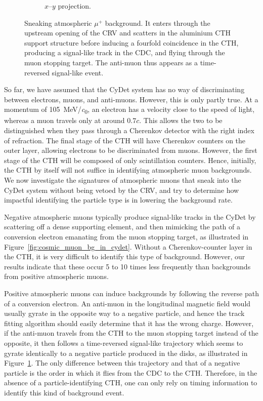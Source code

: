 \begin{figure}
\begin{subfigure}{0.43\textwidth}
        \caption{$x$--$y$ projection.}
    \end{subfigure}
    \caption{ Sneaking atmospheric $\mu^+$ background. It enters through the
        upstream opening of the CRV and scatters in the aluminium CTH support
        structure before inducing a fourfold coincidence in the CTH, producing a
        signal-like track in the CDC, and flying through the muon stopping
        target. The anti-muon thus appears as a time-reversed signal-like event.
        }
    \label{fig:cosmic_antimuon_bg_in_cydet}
\end{figure}


So far, we have assumed that the CyDet system has no way of discriminating
between electrons, muons, and anti-muons. However, this is only partly true. At
a momentum of \SI{105}{\MeV/\clight}, an electron has a velocity close to the speed of
light, whereas a muon travels only at around $0.7 c$. This allows the two to be
distinguished when they pass through a Cherenkov detector with the right index
of refraction. The final stage of the CTH will have Cherenkov counters on the
outer layer, allowing electrons to be discriminated from muons. However, the
first stage of the CTH will be composed of only scintillation counters. Hence,
initially, the CTH by itself will not suffice in identifying atmospheric muon
backgrounds. We now investigate the signatures of atmospheric muons that sneak
into the CyDet system without being vetoed by the CRV, and try to determine how
impactful identifying the particle type is in lowering the background rate.



Negative atmospheric muons typically produce signal-like tracks in the CyDet by
scattering off a dense supporting element, and then mimicking the path of a
conversion electron emanating from the muon stopping target, as illustrated in
Figure~\ref{fig:cosmic_muon_bg_in_cydet}. Without a Cherenkov-counter layer in
the CTH, it is very difficult to identify this type of background. However, our
results indicate that these occur 5 to 10 times less frequently than backgrounds
from positive atmospheric muons.

Positive atmospheric muons can induce backgrounds by following the reverse path
of a conversion electron. An anti-muon in the longitudinal magnetic field would
usually gyrate in the opposite way to a negative particle, and hence the track
fitting algorithm should easily determine that it has the wrong charge. However,
if the anti-muon travels from the CTH to the muon stopping target instead of the
opposite, it then follows a time-reversed signal-like trajectory which seems to
gyrate identically to a negative particle produced in the disks, as illustrated
in Figure~\ref{fig:cosmic_antimuon_bg_in_cydet}. The only difference between
this trajectory and that of a negative particle is the order in which it flies
from the CDC to the CTH. Therefore, in the absence of a particle-identifying
CTH, one can only rely on timing information to identify this kind of background
event.

